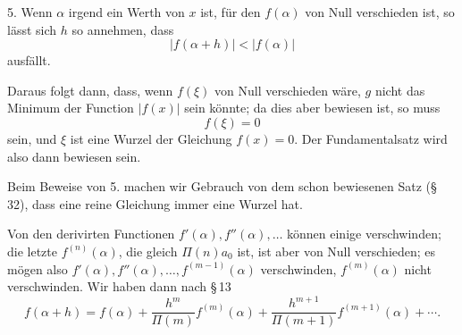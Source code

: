 \documentclass[11pt]{article}
\begin{document}
5. Wenn $\alpha$ irgend ein Werth von $x$ ist, für den $f(\alpha)$ von Null verschieden ist, so lässt sich $h$ so annehmen, dass
\begin{equation}
 |f(\alpha+h)|<|f(\alpha)|
\tag{10}
\end{equation}
ausfällt.

Daraus folgt dann, dass, wenn $f(\xi)$ von Null verschieden wäre, $g$ nicht das Minimum der Function $|f(x)|$ sein könnte; da dies aber bewiesen ist, so muss
\begin{equation}
 f(\xi)=0
\tag{11}
\end{equation}
sein, und $\xi$ ist eine Wurzel der Gleichung $f(x)=0$. Der Fundamentalsatz wird also dann bewiesen sein.

Beim Beweise von 5. machen wir Gebrauch von dem schon bewiesenen Satz (\S\,32), dass eine reine Gleichung immer eine Wurzel hat.

Von den derivirten Functionen $f'(\alpha),f''(\alpha),\ldots$ können einige verschwinden; die letzte $f^{(n)}(\alpha)$, die gleich $\Pi(n)a_0$ ist, ist aber von Null verschieden; es mögen also $f'(\alpha),f''(\alpha),\ldots,f^{(m-1)}(\alpha)$ verschwinden, $f^{(m)}(\alpha)$ nicht verschwinden. Wir haben dann nach \S\,13
\begin{equation}
 f(\alpha+h)=f(\alpha)+\frac{h^m}{\Pi(m)}f^{(m)}(\alpha)
 +\frac{h^{m+1}}{\Pi(m+1)}f^{(m+1)}(\alpha)+\cdots .
\tag{12}
\end{equation}
\end{document}
